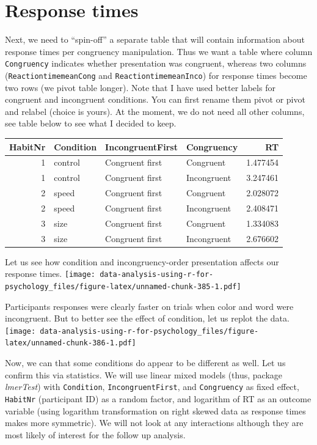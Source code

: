 \documentclass[
]{book}
\begin{document}
\hypertarget{response-times}{%
\section{Response times}\label{response-times}}

Next, we need to ``spin-off'' a separate table that will contain information about response times per congruency manipulation. Thus we want a table where column \texttt{Congruency} indicates whether presentation was congruent, whereas two columns (\texttt{ReactiontimemeanCong} and \texttt{ReactiontimemeanInco}) for response times become two rows (we pivot table longer). Note that I have used better labels for congruent and incongruent conditions. You can first rename them pivot or pivot and relabel (choice is yours). At the moment, we do not need all other columns, see table below to see what I decided to keep.

\begin{tabular}{r|l|l|l|r}
\hline
HabitNr & Condition & IncongruentFirst & Congruency & RT\\
\hline
1 & control & Congruent first & Congruent & 1.477454\\
\hline
1 & control & Congruent first & Incongruent & 3.247461\\
\hline
2 & speed & Congruent first & Congruent & 2.028072\\
\hline
2 & speed & Congruent first & Incongruent & 2.408471\\
\hline
3 & size & Congruent first & Congruent & 1.334083\\
\hline
3 & size & Congruent first & Incongruent & 2.676602\\
\hline
\end{tabular}

Let us see how condition and incongruency-order presentation affects our response times.
\texttt{[image: data-analysis-using-r-for-psychology\_files/figure-latex/unnamed-chunk-385-1.pdf]}

Participants responses were clearly faster on trials when color and word were incongruent. But to better see the effect of condition, let us replot the data.
\texttt{[image: data-analysis-using-r-for-psychology\_files/figure-latex/unnamed-chunk-386-1.pdf]}

Now, we can that some conditions do appear to be different as well. Let us confirm this via statistics. We will use linear mixed models (thus, package \emph{lmerTest}) with \texttt{Condition}, \texttt{IncongruentFirst}, and \texttt{Congruency} as fixed effect, \texttt{HabitNr} (participant ID) as a random factor, and logarithm of RT as an outcome variable (using logarithm transformation on right skewed data as response times makes more symmetric). We will not look at any interactions although they are most likely of interest for the follow up analysis.
\end{document}
